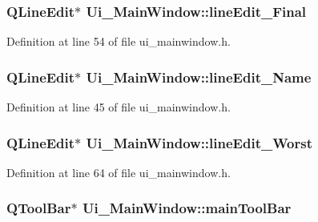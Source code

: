 \subsubsection[{line\+Edit\+\_\+\+Final}]{\setlength{\rightskip}{0pt plus 5cm}Q\+Line\+Edit$\ast$ Ui\+\_\+\+Main\+Window\+::line\+Edit\+\_\+\+Final}\label{class_ui___main_window_a68c792ffc68e4780df20fc5f8b53691b}


Definition at line 54 of file ui\+\_\+mainwindow.\+h.

\hypertarget{class_ui___main_window_acf1a8c011a75bba0ffbae9c2e40a14f0}{}
\subsubsection[{line\+Edit\+\_\+\+Name}]{\setlength{\rightskip}{0pt plus 5cm}Q\+Line\+Edit$\ast$ Ui\+\_\+\+Main\+Window\+::line\+Edit\+\_\+\+Name}\label{class_ui___main_window_acf1a8c011a75bba0ffbae9c2e40a14f0}


Definition at line 45 of file ui\+\_\+mainwindow.\+h.

\hypertarget{class_ui___main_window_ae181778daaff9344ee25e9cf388310f6}{}
\subsubsection[{line\+Edit\+\_\+\+Worst}]{\setlength{\rightskip}{0pt plus 5cm}Q\+Line\+Edit$\ast$ Ui\+\_\+\+Main\+Window\+::line\+Edit\+\_\+\+Worst}\label{class_ui___main_window_ae181778daaff9344ee25e9cf388310f6}


Definition at line 64 of file ui\+\_\+mainwindow.\+h.

\hypertarget{class_ui___main_window_a5172877001c8c7b4e0f6de50421867d1}{}
\subsubsection[{main\+Tool\+Bar}]{\setlength{\rightskip}{0pt plus 5cm}Q\+Tool\+Bar$\ast$ Ui\+\_\+\+Main\+Window\+::main\+Tool\+Bar}\label{class_ui___main_window_a5172877001c8c7b4e0f6de50421867d1}


